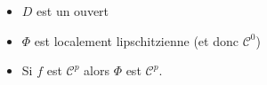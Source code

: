 \begin{prop}[Flot]
    \begin{itemize}
        \item $D$ est un ouvert 
        \item $\Phi$ est localement lipschitzienne (et donc $ \mathcal{C}^0$)
        \item Si $f$ est $ \mathcal{C}^p$ alors $\Phi$ est $ \mathcal{C}^p$. 
    \end{itemize}
\end{prop}